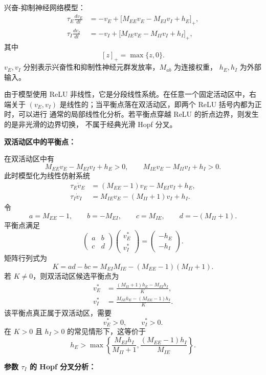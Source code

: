 \documentclass[UTF8]{ctexart}
\begin{document}
兴奋-抑制神经网络模型：
\begin{align}
	\tau_E\frac{dv_E}{dt}
	&=-v_E+\bigl[M_{EE}v_E-M_{EI}v_I+h_E\bigr]_+,
	\label{eq:model_e}\\
	\tau_I\frac{dv_I}{dt}
	&=-v_I+\bigl[M_{IE}v_E-M_{II}v_I+h_I\bigr]_+,
	\label{eq:model_i}
\end{align}
其中
\[
[z]_+=\max\{z,0\}.
\]
$v_E,v_I$ 分别表示兴奋性和抑制性神经元群发放率，$M_{ab}$ 为连接权重，
$h_E,h_I$ 为外部输入。

由于模型使用 ReLU 非线性，它是分段线性系统。在任意一个固定活动区中，右端关于
$(v_E,v_I)$ 是线性的；当平衡点落在双活动区，即两个 ReLU 括号内都为正时，可以进行
通常的局部线性化分析。若平衡点穿越 ReLU 的折点边界，则发生的是非光滑的边界切换，
不属于经典光滑 Hopf 分叉。

\textbf{双活动区中的平衡点：}

在双活动区中有
\[
M_{EE}v_E-M_{EI}v_I+h_E>0,\qquad
M_{IE}v_E-M_{II}v_I+h_I>0.
\]
此时模型化为线性仿射系统
\begin{align}
	\tau_E\dot v_E
	&=(M_{EE}-1)v_E-M_{EI}v_I+h_E,\\
	\tau_I\dot v_I
	&=M_{IE}v_E-(M_{II}+1)v_I+h_I.
\end{align}
令
\[
a=M_{EE}-1,\qquad b=-M_{EI},\qquad
c=M_{IE},\qquad d=-(M_{II}+1).
\]
平衡点满足
\[
\begin{pmatrix}
	a & b\\
	c & d
\end{pmatrix}
\begin{pmatrix}
	v_E^*\\v_I^*
\end{pmatrix}
=
\begin{pmatrix}
	-h_E\\-h_I
\end{pmatrix}.
\]
矩阵行列式为
\[
K=ad-bc=M_{EI}M_{IE}-(M_{EE}-1)(M_{II}+1).
\]
若 $K\ne0$，则双活动区候选平衡点为
\begin{align}
	v_E^*
	&=\frac{(M_{II}+1)h_E-M_{EI}h_I}{K},
	\label{eq:eq_ve}\\
	v_I^*
	&=\frac{M_{IE}h_E-(M_{EE}-1)h_I}{K}.
	\label{eq:eq_vi}
\end{align}
该平衡点真正属于双活动区，需要
\[
v_E^*>0,\qquad v_I^*>0.
\]
在 $K>0$ 且 $h_I>0$ 的常见情形下，这等价于
\begin{equation}
	h_E>
	\max\left\{
	\frac{M_{EI}h_I}{M_{II}+1},
	\frac{(M_{EE}-1)h_I}{M_{IE}}
	\right\}.
	\label{eq:active_boundary}
\end{equation}

\textbf{参数 $\tau_I$ 的 Hopf 分叉分析：}
\end{document}
